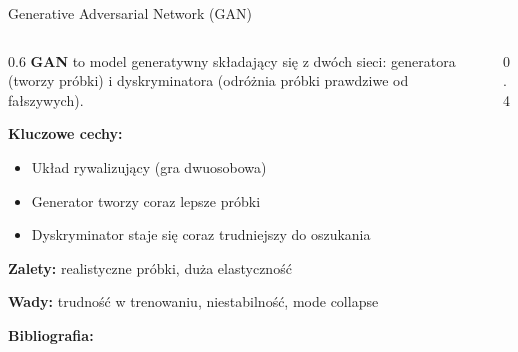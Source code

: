 \documentclass{beamer}
\begin{document}
\begin{frame}{Generative Adversarial Network (GAN)}
    \begin{columns}
        \begin{column}{0.6\textwidth}
            \textbf{GAN} to model generatywny składający się z dwóch sieci: generatora (tworzy próbki) i dyskryminatora (odróżnia próbki prawdziwe od fałszywych).

            \medskip
            \textbf{Kluczowe cechy:}
            \begin{itemize}
                \item Układ rywalizujący (gra dwuosobowa)
                \item Generator tworzy coraz lepsze próbki
                \item Dyskryminator staje się coraz trudniejszy do oszukania
            \end{itemize}

            \textbf{Zalety:} realistyczne próbki, duża elastyczność

            \textbf{Wady:} trudność w trenowaniu, niestabilność, mode collapse

            \textbf{Bibliografia:} \cite{goodfellow2014generative}
        \end{column}
        \begin{column}{0.4\textwidth}
            \centering
        \end{column}
    \end{columns}
\end{frame}
\end{document}
